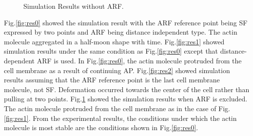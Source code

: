 \documentclass[a4paper,12pt, oneside]{book}
\begin{document}
\begin{figure}[tbp]
 \caption{Simulation Results without ARF.}
 \label{fig:res3}
\end{figure}

Fig.\ref{fig:res0} showed the simulation result with the ARF reference point being SF expressed by two points and ARF being distance independent type. The actin molecule aggregated in a half-moon shape with time. Fig.\ref{fig:res1} showed simulation results under the same condition as Fig.\ref{fig:res0} except that distance-dependent ARF is used. In Fig.\ref{fig:res0}, the actin molecule protruded from the cell membrane as a result of continuing AP. Fig.\ref{fig:res2} showed simulation results assuming that the ARF reference point is the last cell membrane molecule, not SF. Deformation occurred towards the center of the cell rather than pulling at two points. Fig.\ref{fig:res3} showed the simulation results when ARF is excluded. The actin molecule protruded from the cell membrane as in the case of Fig.\ref{fig:res1}. From the experimental results, the conditions under which the actin molecule is most stable are the conditions shown in Fig.\ref{fig:res0}. 
\end{document}
